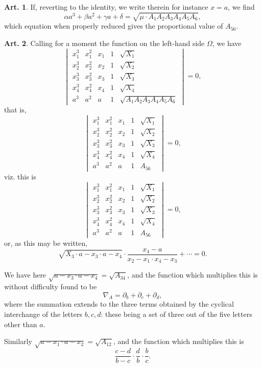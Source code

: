 \documentclass[11pt,a4paper]{article}
\theoremstyle{definition}
\newtheorem{art}{Art.}[section]
\begin{document}
\begin{art}
If, reverting to the identity, we write therein for instance $x = a$, we find
\[
\alpha a^3 + \beta a^2 + \gamma a + \delta = \sqrt{\mu \cdot A_1 A_2 A_3 A_4 A_5 A_6},
\]
which equation when properly reduced gives the proportional value of $A_{56}$.
\end{art}

\begin{art}
Calling for a moment the function on the left-hand side $\Omega$, we have
\[
\begin{vmatrix}
x_1^3 & x_1^2 & x_1 & 1 & \sqrt{X_1} \\
x_2^3 & x_2^2 & x_2 & 1 & \sqrt{X_2} \\
x_3^3 & x_3^2 & x_3 & 1 & \sqrt{X_3} \\
x_4^3 & x_4^2 & x_4 & 1 & \sqrt{X_4} \\
a^3 & a^2 & a & 1 & \sqrt{A_1 A_2 A_3 A_4 A_5 A_6}
\end{vmatrix} = 0,
\]
that is,
\[
\begin{vmatrix}
x_1^3 & x_1^2 & x_1 & 1 & \sqrt{X_1} \\
x_2^3 & x_2^2 & x_2 & 1 & \sqrt{X_2} \\
x_3^3 & x_3^2 & x_3 & 1 & \sqrt{X_3} \\
x_4^3 & x_4^2 & x_4 & 1 & \sqrt{X_4} \\
a^3 & a^2 & a & 1 & A_{56}
\end{vmatrix} = 0,
\]
viz. this is
\[
\begin{vmatrix}
x_1^3 & x_1^2 & x_1 & 1 & \sqrt{X_1} \\
x_2^3 & x_2^2 & x_2 & 1 & \sqrt{X_2} \\
x_3^3 & x_3^2 & x_3 & 1 & \sqrt{X_3} \\
x_4^3 & x_4^2 & x_4 & 1 & \sqrt{X_4} \\
a^3 & a^2 & a & 1 & A_{56}
\end{vmatrix} = 0,
\]
or, as this may be written,
\[
\sqrt{X_3 \cdot a - x_3 \cdot a - x_4} \cdot \frac{x_4 - a}{x_2 - x_1 \cdot x_4 - x_3} + \cdots = 0.
\]

We have here $\sqrt{a - x_3 \cdot a - x_4} = \sqrt{A_{34}}$, and the function which multiplies this is without difficulty found to be
\[
\nabla_A = \partial_b + \partial_c + \partial_d,
\]
where the summation extends to the three terms obtained by the cyclical interchange of the letters $b,c,d$: these being a set of three out of the five letters other than $a$.

Similarly $\sqrt{a - x_1 \cdot a - x_2} = \sqrt{A_{12}}$, and the function which multiplies this is
\[
\frac{c-d}{b-c} \cdot \frac{d}{b} \cdot \frac{b}{c}.
\]


\end{art}
\end{document}
